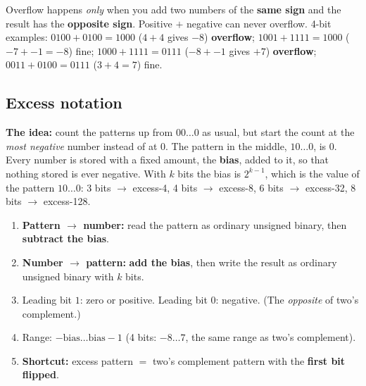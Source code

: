 \documentclass{fkt-notes}
\begin{document}
\begin{rulebox}[title={Overflow in two's complement addition}]
  Overflow happens \emph{only} when you add two numbers of the \textbf{same sign}
  and the result has the \textbf{opposite sign}. Positive $+$ negative can never overflow.
  4-bit examples: $0100+0100=1000$ ($4+4$ gives $-8$)
  \textbf{overflow}; $1001+1111=1000$ ($-7+-1=-8$) fine; $1000+1111=0111$ ($-8+-1$
  gives $+7$) \textbf{overflow}; $0011+0100=0111$ ($3+4=7$) fine.
\end{rulebox}

\subsection{Excess notation}
\textbf{The idea:} count the patterns up from $00\dots0$ as usual, but start the count at the
\emph{most negative} number instead of at $0$. The pattern in the middle, $10\dots0$, is $0$.
Every number is stored with a fixed amount, the \textbf{bias}, added to it, so that nothing
stored is ever negative. With $k$ bits the bias is $2^{k-1}$, which is the value of the pattern $10\dots0$:
3 bits $\to$ excess-4, 4 bits $\to$ excess-8, 6 bits $\to$ excess-32, 8 bits $\to$ excess-128.

\begin{rulebox}[title={Method: excess notation (bias $=2^{k-1}$)}]
  \begin{enumerate}[nosep]
    \item \textbf{Pattern $\to$ number:} read the pattern as ordinary unsigned binary, then
          \textbf{subtract the bias}.
    \item \textbf{Number $\to$ pattern:} \textbf{add the bias}, then write the result as
          ordinary unsigned binary with $k$ bits.
    \item Leading bit $1$: zero or positive. Leading bit $0$: negative. (The \emph{opposite}
          of two's complement.)
    \item Range: $-\text{bias}\dots\text{bias}-1$ (4 bits: $-8\dots7$, the same range as two's complement).
    \item \textbf{Shortcut:} excess pattern $=$ two's complement pattern with the
          \textbf{first bit flipped}.
  \end{enumerate}
\end{rulebox}
\end{document}
